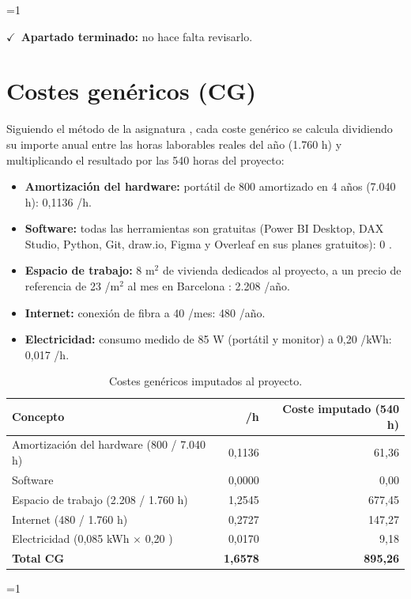 \documentclass[12pt, a4paper, oneside]{report}
\newcommand{\mostrarterminados}{1}
\newenvironment{revisado}
  {\ifnum\mostrarterminados=1\relax\begin{cajarevisada}\noindent\colorbox{verdeterminado}{\parbox{\dimexpr\linewidth-2\fboxsep\relax}{\small$\checkmark$\ \textbf{Apartado terminado:} no hace falta revisarlo.}}\par\medskip\fi}
  {\ifnum\mostrarterminados=1\relax\end{cajarevisada}\fi}
\begin{document}
\begin{revisado}
\section{Costes genéricos (CG)}
Siguiendo el método de la asignatura \cite{fib_costos}, cada coste genérico se calcula dividiendo su importe anual entre las horas laborables reales del año (1.760 h) y multiplicando el resultado por las 540 horas del proyecto:
\begin{itemize}
    \item \textbf{Amortización del hardware:} portátil de 800 \texteuro{} amortizado en 4 años (7.040 h): 0,1136 \texteuro{}/h.
    \item \textbf{Software:} todas las herramientas son gratuitas (Power BI Desktop, DAX Studio, Python, Git, draw.io, Figma y Overleaf en sus planes gratuitos): 0 \texteuro{}.
    \item \textbf{Espacio de trabajo:} 8 m$^2$ de vivienda dedicados al proyecto, a un precio de referencia de 23 \texteuro{}/m$^2$ al mes en Barcelona \cite{idealista_barcelona}: 2.208 \texteuro{}/año.
    \item \textbf{Internet:} conexión de fibra a 40 \texteuro{}/mes: 480 \texteuro{}/año.
    \item \textbf{Electricidad:} consumo medido de 85 W (portátil y monitor) a 0,20 \texteuro{}/kWh: 0,017 \texteuro{}/h.
\end{itemize}

\begin{table}[H]
\centering
\small
\renewcommand{\arraystretch}{1.05}
\begin{tabularx}{\textwidth}{@{} X r r @{}}
\toprule
\textbf{Concepto} & \textbf{\texteuro{}/h} & \textbf{Coste imputado (540 h)} \\ \midrule
Amortización del hardware (800 \texteuro{} / 7.040 h) & 0,1136 & 61,36 \texteuro{} \\
Software & 0,0000 & 0,00 \texteuro{} \\
Espacio de trabajo (2.208 \texteuro{} / 1.760 h) & 1,2545 & 677,45 \texteuro{} \\
Internet (480 \texteuro{} / 1.760 h) & 0,2727 & 147,27 \texteuro{} \\
Electricidad (0,085 kWh $\times$ 0,20 \texteuro{}) & 0,0170 & 9,18 \texteuro{} \\ \midrule
\textbf{Total CG} & \textbf{1,6578} & \textbf{895,26 \texteuro{}} \\ \bottomrule
\end{tabularx}
\caption{Costes genéricos imputados al proyecto.}
\label{tab:cg}
\end{table}


\end{revisado}
\end{document}
